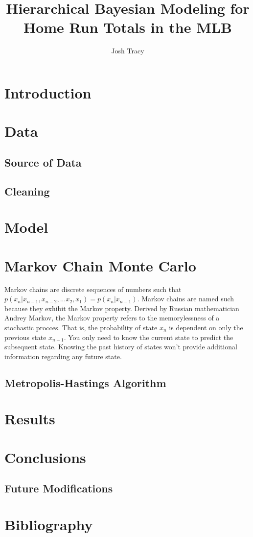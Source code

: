 \documentclass[11pt]{article}
\theoremstyle{definition}
\begin{document}
\title{Hierarchical Bayesian Modeling for Home Run Totals in the MLB}
\author{Josh Tracy}
\date{}



\maketitle


\section{Introduction}



\section{Data}

\subsection{Source of Data}

\subsection{Cleaning}


\section{Model}


\section{Markov Chain Monte Carlo}

Markov chains are discrete sequences of numbers such that $p(x_n | x_{n-1}, x_{n-2}, ...x_2, x_1) = p(x_n | x_{n-1})$. Markov chains are named such because they exhibit the Markov property. Derived by Russian mathematician Andrey Markov, the Markov property refers to the memorylessness of a stochastic procces. That is, the probability of state $x_n$ is dependent on only the previous state $x_{n-1}$. You only need to know the current state to predict the subsequent state. Knowing the past history of states won't provide additional information regarding any future state. 

\subsection{Metropolis-Hastings Algorithm}


\section{Results}

\section{Conclusions}

\subsection{Future Modifications}


\section*{Bibliography}
\end{document}
